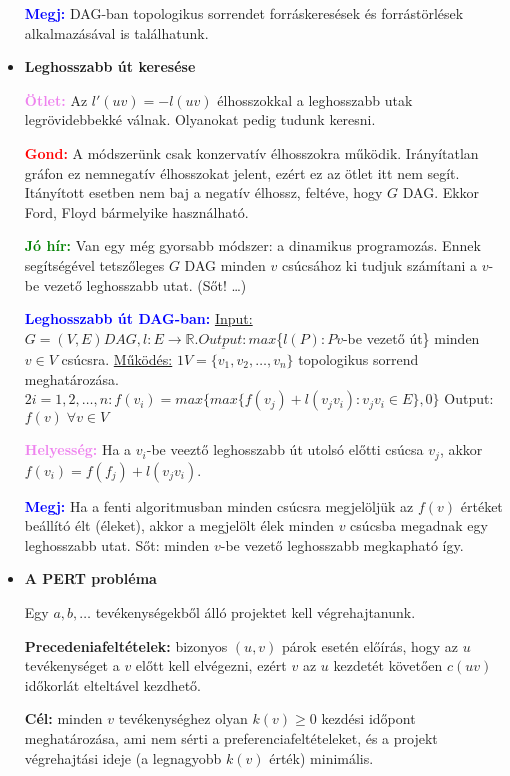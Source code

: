 \documentclass[../../szobeli.tex]{subfiles}
\begin{document}
\begin{itemize}
        \textcolor{blue}{\textbf{Megj:}} DAG-ban topologikus sorrendet forráskeresések és forrástörlések alkalmazásával is találhatunk.

        \item \textbf{Leghosszabb út keresése}

        \textcolor{violet}{\textbf{Ötlet:}} Az $l'(uv) = -l(uv)$ élhosszokkal a leghosszabb utak legrövidebbekké válnak. Olyanokat pedig tudunk keresni.

        \textcolor{red}{\textbf{Gond:}} A módszerünk csak konzervatív élhosszokra működik. Irányítatlan gráfon ez nemnegatív élhosszokat jelent, ezért ez az ötlet itt nem segít. Itányított esetben nem baj a negatív élhossz, feltéve, hogy $G$ DAG. Ekkor Ford, Floyd bármelyike használható.

        \textcolor{green}{\textbf{Jó hír:}} Van egy még gyorsabb módszer: a dinamikus programozás. Ennek segítségével tetszőleges $G$ DAG minden $v$ csúcsához ki tudjuk számítani a $v$-be vezető leghosszabb utat. (Sőt! \dots)

        \textcolor{blue}{\textbf{Leghosszabb út DAG-ban:}} \underline{Input:} $G = (V,E) DAG, l:E \rightarrow \mathbb{R}. \underline{Output:} max$\{$l(P):P v$-be vezető út\} minden $v \in V$ csúcsra. \underline{Működés:} $\boxed{1} V = \{v_1,v_2,\dots,v_n\}$ topologikus sorrend meghatározása. $\boxed{2} i = 1,2,\dots,n: f(v_i) = max\{max\{f(v_j)+l(v_jv_i):v_jv_i \in E\},0\}$ Output: $f(v)\; \forall v \in V$

        \textcolor{violet}{\textbf{Helyesség:}} Ha a $v_i$-be veeztő leghosszabb út utolsó előtti csúcsa $v_j$, akkor $f(v_i) = f(f_j) + l(v_jv_i)$.

        \textcolor{blue}{\textbf{Megj:}} Ha a fenti algoritmusban minden csúcsra megjelöljük az $f(v)$ értéket beállító élt (éleket), akkor a megjelölt élek minden $v$ csúcsba megadnak egy leghosszabb utat. Sőt: minden $v$-be vezető leghosszabb megkapható így.

        \item \textbf{A PERT probléma}

        Egy $a,b,\dots$ tevékenységekből álló projektet kell végrehajtanunk. 

        \textbf{Precedeniafeltételek:} bizonyos $(u,v)$ párok esetén előírás, hogy az $u$ tevékenységet a $v$ előtt kell elvégezni, ezért $v$ az $u$ kezdetét követően $c(uv)$ időkorlát elteltável kezdhető.

        \textbf{Cél:} minden $v$ tevékenységhez olyan $k(v) \geq 0$ kezdési időpont meghatározása, ami nem sérti a preferenciafeltételeket, és a projekt végrehajtási ideje (a legnagyobb $k(v)$ érték) minimális.


\end{itemize}
\end{document}
